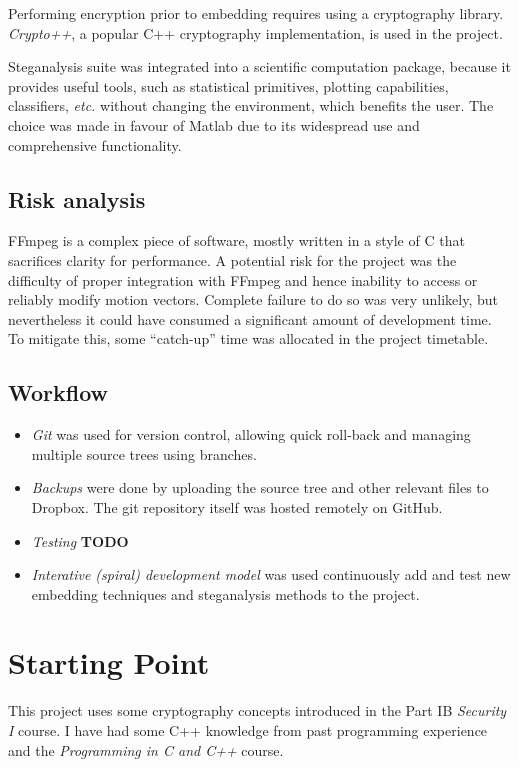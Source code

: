 \documentclass[12pt,british,twoside,notitlepage,usenames,dvipsnames,hypens,final]{report}
\numberwithin{equation}{section}
\numberwithin{figure}{section}
\begin{document}
Performing encryption prior to embedding requires using a cryptography library. \emph{Crypto++}, a popular C++ cryptography implementation, is used in the project.

Steganalysis suite was integrated into a scientific computation package, because it provides useful tools, such as statistical primitives, plotting capabilities, classifiers, \textit{etc.} without changing the environment, which benefits the user. The choice was made in favour of Matlab due to its widespread use and comprehensive functionality.

\subsection{Risk analysis}
FFmpeg is a complex piece of software, mostly written in a style of C that sacrifices clarity for performance. A potential risk for the project was the difficulty of proper integration with FFmpeg and hence inability to access or reliably modify motion vectors. Complete failure to do so was very unlikely, but nevertheless it could have consumed a significant amount of development time. To mitigate this, some ``catch-up'' time was allocated in the project timetable.  

\subsection{Workflow}
\begin{itemize}
\item \emph{Git} was used for version control, allowing quick roll-back and managing multiple source trees using branches.
\item \emph{Backups} were done by uploading the source tree and other relevant files to Dropbox. The git repository itself was hosted remotely on GitHub.
\item \emph{Testing} \textbf{TODO}
\item \emph{Interative (spiral) development model} was used continuously add and test new embedding techniques and steganalysis methods to the project.
\end{itemize}

\section{Starting Point}
This project uses some cryptography concepts introduced in the Part IB \textit{Security I} course. I have had some C++ knowledge from past programming experience and the \textit{Programming in C and C++} course. 
\end{document}
